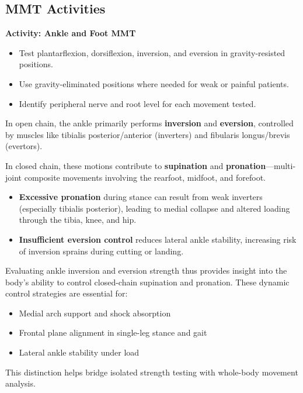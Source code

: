 \subsection*{MMT Activities}

\begin{labactivitybox}
\textbf{Activity: Ankle and Foot MMT}
\begin{itemize}
  \item Test plantarflexion, dorsiflexion, inversion, and eversion in gravity-resisted positions.
  \item Use gravity-eliminated positions where needed for weak or painful patients.
  \item Identify peripheral nerve and root level for each movement tested.
\end{itemize}
\end{labactivitybox}

\begin{tcolorbox}[colback=gray!5, colframe=black, title={Clinical Relevance: Inversion, Eversion, and Dynamic Foot Control}]
In open chain, the ankle primarily performs \textbf{inversion} and \textbf{eversion}, controlled by muscles like tibialis posterior/anterior (inverters) and fibularis longus/brevis (evertors).

In closed chain, these motions contribute to \textbf{supination} and \textbf{pronation}—multi-joint composite movements involving the rearfoot, midfoot, and forefoot.

\begin{itemize}
  \item \textbf{Excessive pronation} during stance can result from weak inverters (especially tibialis posterior), leading to medial collapse and altered loading through the tibia, knee, and hip.
  \item \textbf{Insufficient eversion control} reduces lateral ankle stability, increasing risk of inversion sprains during cutting or landing.
\end{itemize}

Evaluating ankle inversion and eversion strength thus provides insight into the body’s ability to control closed-chain supination and pronation. These dynamic control strategies are essential for:
\begin{itemize}
  \item Medial arch support and shock absorption
  \item Frontal plane alignment in single-leg stance and gait
  \item Lateral ankle stability under load
\end{itemize}

This distinction helps bridge isolated strength testing with whole-body movement analysis.
\end{tcolorbox}

